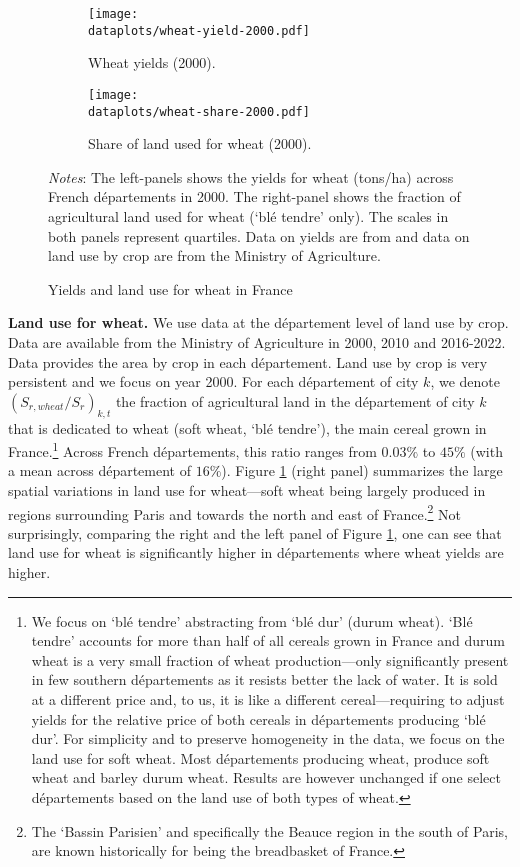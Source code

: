 \documentclass[11pt]{report}
\newcommand{\dataplots}{../../output/data/plots}
\begin{document}
\begin{figure}[h]
	\begin{adjustbox}{center}	
		\begin{subfigure}{0.6\textwidth}
			\texttt{[image: \\dataplots/wheat-yield-2000.pdf]}
			\caption{Wheat yields (2000).}
		\end{subfigure}
		\hspace{-1cm}
		\begin{subfigure}{0.6\textwidth}
			\texttt{[image: \\dataplots/wheat-share-2000.pdf]}
			\caption{Share of land used for wheat (2000).}
		\end{subfigure}	
	\end{adjustbox}		
	\caption{Yields and land use for wheat in France\label{A-fig:wheat}}
	{\footnotesize \textit{Notes}: The left-panels shows the yields for wheat (tons/ha) across French départements in 2000. The right-panel shows the fraction of agricultural land used for wheat (`blé tendre' only). The scales in both panels represent quartiles. Data on yields are from \cite{schaubergeretal2022} and data on land use by crop are from the Ministry of Agriculture.}
\end{figure}

\noindent \textbf{Land use for wheat.} We use data at the département level of land use by crop. Data are available from the Ministry of Agriculture in 2000, 2010 and 2016-2022. Data provides the area by crop in each département. Land use by crop is very persistent and we focus on year 2000. For each département of city $k$, we denote $(S_{r,wheat}/S_r)_{k,t}$ the fraction of agricultural land in the département of city $k$ that is dedicated to wheat (soft wheat, `blé tendre'), the main cereal grown in France.\footnote{We focus on `blé tendre' abstracting from `blé dur' (durum wheat). `Blé tendre' accounts for more than half of all cereals grown in France and durum wheat is a very small fraction of wheat production---only significantly present in few southern départements as it resists better the lack of water. It is sold at a different price and, to us, it is like a different cereal---requiring to adjust yields for the relative price of both cereals in départements producing `blé dur'. For simplicity and to preserve homogeneity in the data, we focus on the land use for soft wheat. Most départements producing wheat, produce soft wheat and barley durum wheat. Results are however unchanged if one select départements based on the land use of both types of wheat.} Across French départements, this ratio ranges from $0.03\%$ to $45\%$ (with a mean across département of $16\%$). Figure \ref{A-fig:wheat} (right panel) summarizes the large spatial variations in land use for wheat---soft wheat being largely produced in regions surrounding Paris and towards the north and east of France.\footnote{The `Bassin Parisien' and specifically the Beauce region in the south of Paris, are known historically for being the breadbasket of France.} Not surprisingly, comparing the right and the left panel of Figure \ref{A-fig:wheat}, one can see that land use for wheat is significantly higher in départements where wheat yields are higher. 
\end{document}
